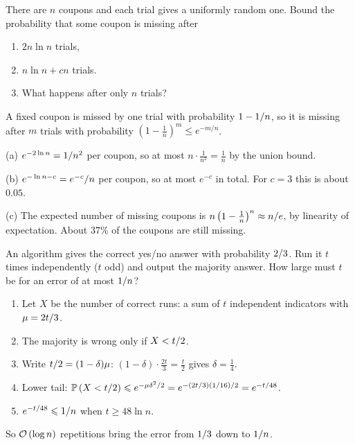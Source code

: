 \begin{exercisebox}
\begin{pproblem}\label{pp:coupon}
    There are $n$ coupons and each trial gives a uniformly random one. Bound the probability that
    some coupon is missing after
    \begin{enumerate}[label=(\alph*)]
        \item $2n \ln n$ trials,
        \item $n \ln n + cn$ trials.
        \item What happens after only $n$ trials?
    \end{enumerate}
\end{pproblem}
\tcblower
\begin{wsolution}
    A fixed coupon is missed by one trial with probability $1 - 1/n$, so it is missing
    after $m$ trials with probability $\left(1 - \frac{1}{n}\right)^m \leq e^{-m/n}$.

    (a) $e^{-2 \ln n} = 1/n^2$ per coupon, so at most $n \cdot \frac{1}{n^2} = \frac{1}{n}$
    by the union bound.

    (b) $e^{-\ln n - c} = e^{-c}/n$ per coupon, so at most $e^{-c}$ in total. For $c = 3$
    this is about $0.05$.

    (c) The expected number of missing coupons is
    $n\left(1 - \frac{1}{n}\right)^n \approx n/e$, by linearity of expectation. About
    $37\%$ of the coupons are still missing.
\end{wsolution}
\end{exercisebox}

\begin{exercisebox}
\begin{pproblem}\label{pp:majority}
    An algorithm gives the correct yes/no answer with probability $2/3$. Run it $t$ times
    independently ($t$ odd) and output the majority answer. How large must $t$ be for an error of at
    most $1/n$?
\end{pproblem}
\tcblower
\begin{wsolution}
    \leavevmode
    \begin{enumerate}
        \item Let $X$ be the number of correct runs: a sum of $t$ independent indicators with
              $\mu = 2t/3$.
        \item The majority is wrong only if $X < t/2$.
        \item Write $t/2 = (1 - \delta)\mu$: $(1 - \delta) \cdot \frac{2t}{3} = \frac{t}{2}$
              gives $\delta = \frac{1}{4}$.
        \item Lower tail:
              $\operatorname{\mathbb{P}}\left(X < t/2\right) \leqslant e^{-\mu\delta^2/2} = e^{-(2t/3)(1/16)/2} = e^{-t/48}$.
        \item $e^{-t/48} \leqslant 1/n$ when $t \geq 48 \ln n$.
    \end{enumerate}
    So $\mathcal{O}\left(\log n\right)$ repetitions bring the error from $1/3$ down to $1/n$.
\end{wsolution}
\end{exercisebox}

